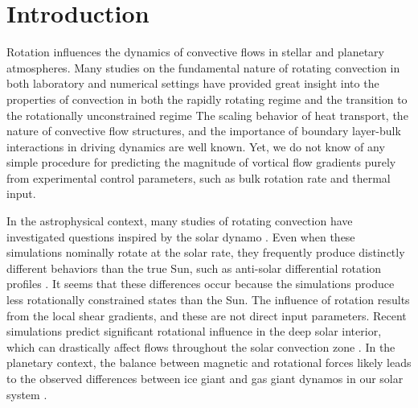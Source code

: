\documentclass[twocolumn, amsmath, amsfonts, amssymb, trackchanges]{aastex62}
\begin{document}
\section{Introduction}
\label{sec:intro}
Rotation influences the dynamics of convective flows in
stellar and planetary atmospheres.
Many studies on the fundamental nature of
rotating convection in both laboratory and numerical settings
have provided great insight into the properties of convection 
in both the rapidly rotating regime 
and the transition to the rotationally unconstrained regime 
\citep{king&all2009, zhong&all2009, schmitz&tilgner2009, king&all2012, julien&all2012, king&all2013, ecke&niemela2014, stellmach&all2014, cheng&all2015, gastine&all2016}
The scaling behavior of heat transport, the nature of convective flow
structures, and the importance of boundary layer-bulk interactions in driving dynamics are well known.
Yet, we do not know of any simple procedure for predicting the magnitude of vortical flow gradients 
purely from experimental control parameters, such as bulk rotation rate and thermal input.

In the astrophysical context,
many studies of rotating convection have investigated questions inspired by the solar dynamo
\citep{glatzmaier&gilman1982, busse2002, brown&all2008,
brown&all2010, brown&all2011, augustson&all2012, guerrero&all2013, kapyla&all2014}.
Even when these simulations nominally rotate at the solar rate,
they frequently produce distinctly different behaviors than the true Sun,
such as anti-solar differential rotation profiles  \citep{gastine&all2014, brun&all2017}.
It seems that these differences occur because the simulations produce less rotationally 
constrained states than the Sun. 
The influence of rotation results from the local 
shear gradients, and these are not direct input parameters.
Recent simulations predict significant rotational influence in the deep solar interior, 
which can drastically affect flows throughout the solar convection zone 
\citep{featherstone&hindman2016, greer&all2016}. 
In the planetary context, the balance between magnetic
and rotational forces likely leads to the observed differences between ice
giant and gas giant dynamos in our solar system \citep{soderlund&all2015}.
\end{document}
